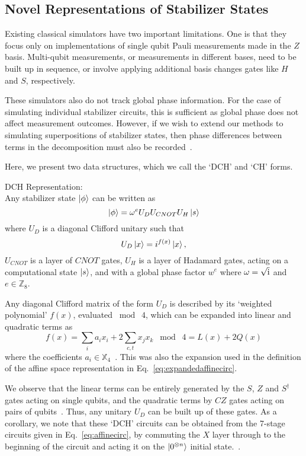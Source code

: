 \subsection{Novel Representations of Stabilizer States}
Existing classical simulators have two important limitations. One is that they focus only on implementations of single qubit Pauli measurements made in the $Z$ basis. Multi-qubit measurements, or measurements in different bases, need to be built up in sequence, or involve applying additional basis changes gates like $H$ and $S$, respectively.\par
These simulators also do not track global phase information. For the case of simulating individual stabilizer circuits, this is sufficient as global phase does not affect measurement outcomes. However, if we wish to extend our methods to simulating superpositions of stabilizer states, then phase differences between terms in the decomposition must also be recorded~\cite{Garcia2015}.\par
Here, we present two data structures, which we call the `DCH' and `CH' forms.
\clearpage
\begin{defn}
DCH Representation:\\
Any stabilizer state $\ket{\phi}$ can be written as
\begin{equation}\ket{\phi} = \omega^{e}U_{D} U_{CNOT} U_{H} \ket{s}
\label{eq:dch}
\end{equation}
where $U_{D}$ is a diagonal Clifford unitary such that
\[
U_{D}\ket{x} = i^{f(x)}\ket{x},
\]
$U_{CNOT}$ is a layer of $CNOT$ gates, $U_{H}$ is a layer of Hadamard gates, acting on a computational state $\ket{s}$, and with a global phase factor $w^{e}$ where $\omega=\sqrt{\mathrm{i}}$ and $e\in\mathbb{Z}_{8}$.\label{def:dch}
\end{defn}
Any diagonal Clifford matrix of the form $U_{D}$ is described by its `weighted polynomial' $f(x)$, evaluated $\bmod\; 4$, which can be expanded into linear and quadratic terms as
\[
    f(x) = \sum_{i}a_{i}x_{i} + 2\sum_{c,t}x_{j}x_{k}\;\bmod\;4 = L(x) + 2Q(x)
\]
where the coefficients $a_{i}\in\mathbb{X}_{4}$~\cite{VandenNest2008,Campbell2016}. This was also the expansion used in the definition of the affine space representation in Eq.~\ref{eq:expandedaffinecirc}.\par
We observe that the linear terms can be entirely generated by the $S$, $Z$ and $S^{\dagger}$ gates acting on single qubits, and the quadratic terms by $CZ$ gates acting on pairs of qubits~\cite{Campbell2016}. Thus, any unitary $U_{D}$ can be built up of these gates. As a corollary, we note that these `DCH' circuits can be obtained from the 7-stage circuits given in Eq.~\ref{eq:affinecirc}, by commuting the $X$ layer through to the beginning of the circuit and acting it on the $\ket{0^{\otimes n}}$ initial state.~\cite{VandenNest2008}.\par
